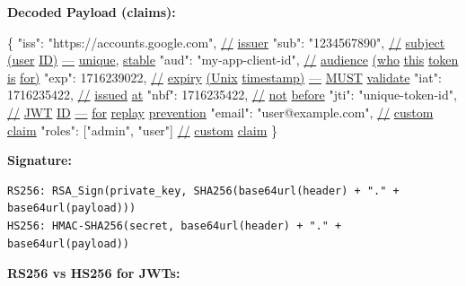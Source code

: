 \documentclass[11pt]{article}
\newenvironment{Shaded}{\begin{snugshade}}{\end{snugshade}}
\newcommand{\DataTypeTok}[1]{\textcolor[rgb]{0.16,0.50,0.73}{#1}}
\newcommand{\DecValTok}[1]{\textcolor[rgb]{0.96,0.45,0.00}{#1}}
\newcommand{\ErrorTok}[1]{\textcolor[rgb]{0.85,0.27,0.33}{\underline{#1}}}
\newcommand{\FunctionTok}[1]{\textcolor[rgb]{0.56,0.27,0.68}{#1}}
\newcommand{\OtherTok}[1]{\textcolor[rgb]{0.15,0.68,0.38}{#1}}
\newcommand{\StringTok}[1]{\textcolor[rgb]{0.96,0.31,0.31}{#1}}
\begin{document}
\textbf{Decoded Payload (claims):}


\begin{Shaded}
\begin{Highlighting}[]
\FunctionTok{\{}
  \DataTypeTok{"iss"}\FunctionTok{:} \StringTok{"https://accounts.google.com"}\FunctionTok{,}  \ErrorTok{//} \ErrorTok{issuer}
  \DataTypeTok{"sub"}\FunctionTok{:} \StringTok{"1234567890"}\FunctionTok{,}                   \ErrorTok{//} \ErrorTok{subject} \ErrorTok{(user} \ErrorTok{ID)} \ErrorTok{—} \ErrorTok{unique}\FunctionTok{,} \ErrorTok{stable}
  \DataTypeTok{"aud"}\FunctionTok{:} \StringTok{"my{-}app{-}client{-}id"}\FunctionTok{,}            \ErrorTok{//} \ErrorTok{audience} \ErrorTok{(who} \ErrorTok{this} \ErrorTok{token} \ErrorTok{is} \ErrorTok{for)}
  \DataTypeTok{"exp"}\FunctionTok{:} \DecValTok{1716239022}\FunctionTok{,}                     \ErrorTok{//} \ErrorTok{expiry} \ErrorTok{(Unix} \ErrorTok{timestamp)} \ErrorTok{—} \ErrorTok{MUST} \ErrorTok{validate}
  \DataTypeTok{"iat"}\FunctionTok{:} \DecValTok{1716235422}\FunctionTok{,}                     \ErrorTok{//} \ErrorTok{issued} \ErrorTok{at}
  \DataTypeTok{"nbf"}\FunctionTok{:} \DecValTok{1716235422}\FunctionTok{,}                     \ErrorTok{//} \ErrorTok{not} \ErrorTok{before}
  \DataTypeTok{"jti"}\FunctionTok{:} \StringTok{"unique{-}token{-}id"}\FunctionTok{,}             \ErrorTok{//} \ErrorTok{JWT} \ErrorTok{ID} \ErrorTok{—} \ErrorTok{for} \ErrorTok{replay} \ErrorTok{prevention}
  \DataTypeTok{"email"}\FunctionTok{:} \StringTok{"user@example.com"}\FunctionTok{,}          \ErrorTok{//} \ErrorTok{custom} \ErrorTok{claim}
  \DataTypeTok{"roles"}\FunctionTok{:} \OtherTok{[}\StringTok{"admin"}\OtherTok{,} \StringTok{"user"}\OtherTok{]}            \ErrorTok{//} \ErrorTok{custom} \ErrorTok{claim}
\FunctionTok{\}}
\end{Highlighting}
\end{Shaded}

\textbf{Signature:}

\setcodelang{}

\begin{verbatim}
RS256: RSA_Sign(private_key, SHA256(base64url(header) + "." + base64url(payload)))
HS256: HMAC-SHA256(secret, base64url(header) + "." + base64url(payload))
\end{verbatim}

\textbf{RS256 vs HS256 for JWTs:}
\end{document}
